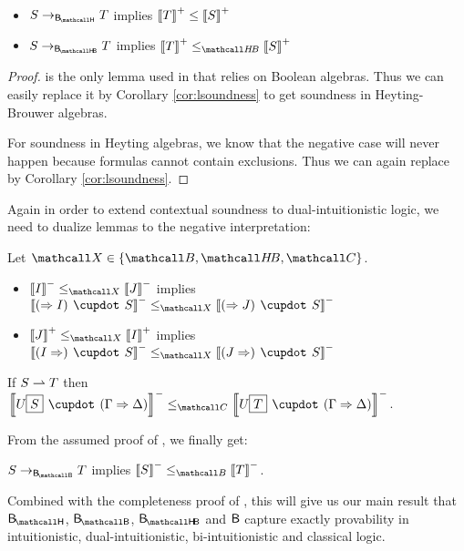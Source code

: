 \begin{corollary}\label{cor:soundness}
  ~\\\vspace{-1em}
  \begin{itemize}
    \item $S \stepsys{\sysBH} T$ implies $\left\llbracket T \right\rrbracket^+ \leq \left\llbracket S \right\rrbracket^+$
    \item $S \stepsys{\sysBHB} T$ implies $\psint{T} \sementHB \psint{S}$
  \end{itemize}
\end{corollary}
\begin{proof}
   is the only lemma used in
   that relies on Boolean algebras. Thus we can
  easily replace it by Corollary \ref{cor:lsoundness} to get soundness in Heyting-Brouwer
  algebras.

  For soundness in Heyting algebras, we know that the negative case will never
  happen because formulas cannot contain exclusions. Thus we can again replace
   by Corollary \ref{cor:lsoundness}.
\end{proof}

Again in order to extend contextual soundness to dual-intuitionistic logic, we
need to dualize lemmas to the negative interpretation:

\begin{lemma}[Co-functoriality]
  Let $\ACVar \in \{\Brouwer, \HeytingBrouwer, \Boolean\}$.
  ~\\\vspace{-1em}
  \begin{itemize}
    \item $\nsint{I} \sementX \nsint{J}$ implies $\nsint{(\seq I) \mix S}
    \sementX \nsint{(\seq J) \mix S}$
    \item $\psint{J} \sementX \psint{I}$ implies $\nsint{(I \seq) \mix S}
    \sementX \nsint{(J \seq) \mix S}$
  \end{itemize}
\end{lemma}

\begin{lemma}
  If $S \rightharpoonup T$ then $\nsint{U\select{S} \mix (\Gamma \seq \Delta)} \sementC
  \nsint{U\select{T} \mix (\Gamma \seq \Delta)}$.
\end{lemma}

From the assumed proof of , we finally get:

\begin{corollary}\label{cor:cosoundness}
  $S \stepsys{\sysBB} T$ implies $\nsint{S} \sementB \nsint{T}$.
\end{corollary}

Combined with the completeness proof of , this will
give us our main result that $\sysBH$, $\sysBB$, $\sysBHB$ and $\mathsf{B}$ capture
exactly provability in intuitionistic, dual-intuitionistic, bi-intuitionistic
and classical logic.